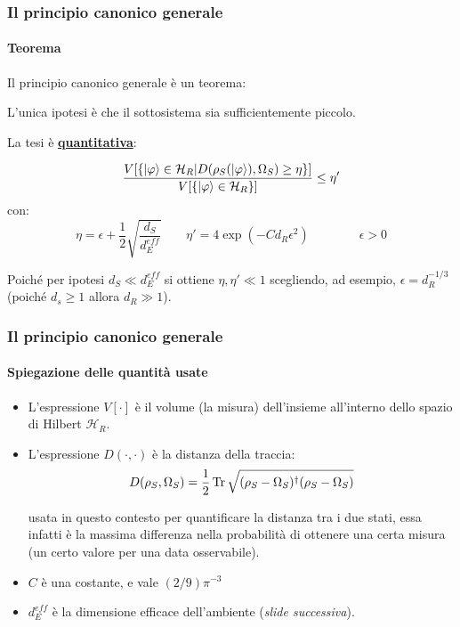 \documentclass{beamer}
\theoremstyle{definition}
\theoremstyle{plain}
\begin{document}
\begin{frame}
	\frametitle{Il principio canonico generale}
	\framesubtitle{Teorema}
	\hypertarget{th}{}
	
	Il principio canonico generale è un teorema:
	
	\pause
	\begin{description}[<+->]
		\item[Ipotesi] L'unica ipotesi è che il sottosistema sia sufficientemente piccolo.
		\item[Tesi] La tesi è \hyperlink{LevyLemma}{\textbf{quantitativa}}:
		\begin{block}{}
			\begin{equation*}
				\frac{V[\{\ket{\varphi} \in \mathcal{H}_R | D(\rho_S(\ket{\varphi}), \Omega_S) \geq \eta\}]}{V[\{\ket{\varphi} \in \mathcal{H}_R\}]} \leq \eta'
			\end{equation*}
			con:
			\begin{equation*}
			\eta = \epsilon + \frac{1}{2} \sqrt{\frac{d_S}{d_E^{eff}}} \qquad	\eta' = 4\exp(-Cd_R\epsilon^2)	\qquad	\qquad	\epsilon > 0
			\end{equation*}
		\end{block}
		\pause[4]
	Poiché per ipotesi $d_S \ll d_E^{eff}$ si ottiene $\eta, \eta' \ll 1$ scegliendo, ad esempio, $\epsilon = d_R^{-1/3}$ (poiché $d_s \geq 1$ allora $d_R \gg 1$).
	\end{description}
\end{frame}

\begin{frame}
	\frametitle{Il principio canonico generale}
	\framesubtitle{Spiegazione delle quantità usate}
	
	\begin{itemize}[<+->]
		\item L'espressione $V[\cdot]$ è il volume (la misura) dell'insieme all'interno dello spazio di Hilbert $\mathcal{H}_R$.
		\item L'espressione $D(\cdot,\cdot)$ è la distanza della traccia:
		\begin{equation*}
			D(\rho_S, \Omega_S) = \frac{1}{2} \Tr \sqrt{(\rho_S - \Omega_S)^\dagger(\rho_S - \Omega_S)}
		\end{equation*}
		
		usata in questo contesto per quantificare la distanza tra i due stati, essa infatti è la massima differenza nella probabilità di ottenere una certa misura (un certo valore per una data osservabile).
		\item $C$ è una costante, e vale $(2/9)\pi^{-3}$
		\item $d_E^{eff}$ è la dimensione efficace dell'ambiente (\textit{slide successiva}).
	\end{itemize}
\end{frame}
\end{document}
